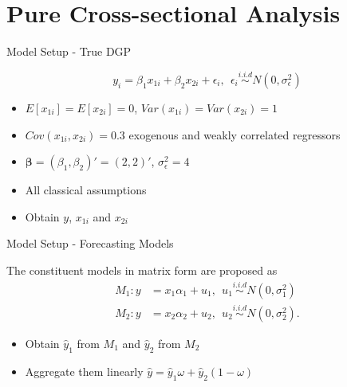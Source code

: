 \section{Pure Cross-sectional Analysis}

\begin{frame}{Model Setup - True DGP}

\Large
\[y_i = \beta_1 x_{1i} + \beta_2 x_{2i} + \epsilon_i, \ \ \epsilon_i \stackrel{i.i.d}{\sim} N(0,\sigma^2_{\epsilon})\]

\vspace{5mm}
\normalsize
\begin{itemize}
    \item $E[x_{1i}] = E[x_{2i}] = 0$, $Var(x_{1i}) = Var(x_{2i}) = 1$
    \item $Cov(x_{1i}, x_{2i}) = 0.3$ exogenous and weakly correlated regressors
    \item $\pmb{\beta} = (\beta_1, \beta_2)' = (2,2)'$, $\sigma^2_{\epsilon}=4$
    \item All classical assumptions
    \vspace{3mm}
    \item Obtain $y$, $x_{1i}$ and $x_{2i}$
\end{itemize}

\end{frame}



\begin{frame}{Model Setup - Forecasting Models}

The constituent models in matrix form are proposed as
\Large
\begin{align*}
M_1 : y &= x_1 \alpha_{1} + u_1, \ \ u_{1} \stackrel{i.i.d}{\sim} N(0,\sigma^2_1) \\
M_2 : y &= x_2 \alpha_{2} + u_2, \ \ u_{2} \stackrel{i.i.d}{\sim} N(0,\sigma^2_2).
\end{align*}
\normalsize
\begin{itemize}
    \item Obtain $\hat y_{1}$ from $M_1$ and $\hat y_{2}$ from $M_2$
    \vspace{3mm}
    \item Aggregate them linearly $\hat y = \hat y_{1}\omega + \hat y_{2}(1-\omega)$
\end{itemize}

\end{frame}



